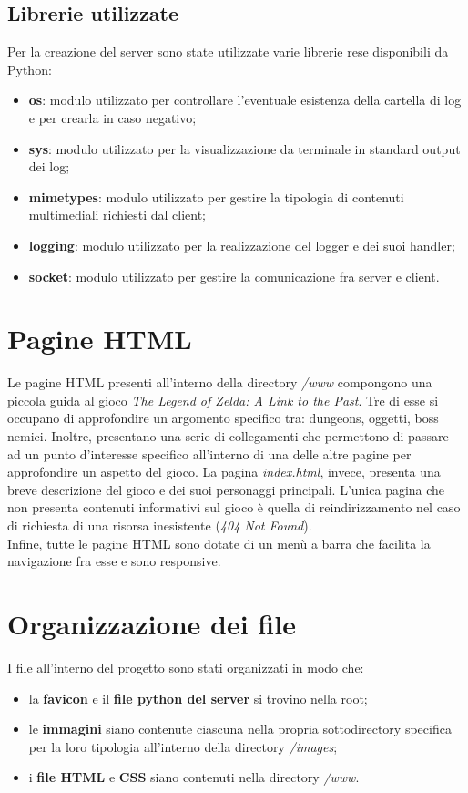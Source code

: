 \documentclass[a4paper,12pt]{report}
\begin{document}
\subsection{Librerie utilizzate}
Per la creazione del server sono state utilizzate varie librerie rese disponibili da Python:
\begin{itemize}
    \item \textbf{os}: modulo utilizzato per controllare l'eventuale esistenza della cartella di log e per crearla in caso negativo;
    \item \textbf{sys}: modulo utilizzato per la visualizzazione da terminale in standard output dei log;
    \item \textbf{mimetypes}: modulo utilizzato per gestire la tipologia di contenuti multimediali richiesti dal client;
    \item \textbf{logging}: modulo utilizzato per la realizzazione del logger e dei suoi handler;
    \item \textbf{socket}: modulo utilizzato per gestire la comunicazione fra server e client.
\end{itemize}

\section{Pagine HTML}
Le pagine HTML presenti all'interno della directory \textit{/www} compongono una piccola guida al gioco \textit{The Legend of Zelda: A Link to the Past}.
Tre di esse si occupano di approfondire un argomento specifico tra: dungeons, oggetti, boss nemici. Inoltre, presentano una serie di collegamenti che permettono di passare ad un punto d'interesse specifico all'interno di una delle altre pagine per approfondire un aspetto del gioco.
La pagina \textit{index.html}, invece, presenta una breve descrizione del gioco e dei suoi personaggi principali.
L'unica pagina che non presenta contenuti informativi sul gioco è quella di reindirizzamento nel caso di richiesta di una risorsa inesistente (\textit{404 Not Found}).
\\Infine, tutte le pagine HTML sono dotate di un menù a barra che facilita la navigazione fra esse e sono responsive.

\section{Organizzazione dei file}
I file all'interno del progetto sono stati organizzati in modo che:
\begin{itemize}
    \item la \textbf{favicon} e il \textbf{file python del server} si trovino nella root;
    \item le \textbf{immagini} siano contenute ciascuna nella propria sottodirectory specifica per la loro tipologia all'interno della directory \textit{/images};
    \item i \textbf{file HTML} e \textbf{CSS} siano contenuti nella directory \textit{/www}.
\end{itemize}
\end{document}
